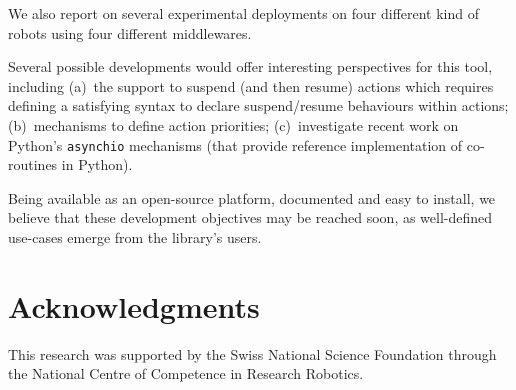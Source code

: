 \documentclass[letterpaper, 10pt, conference]{ieeeconf}      %
\begin{document}
We also report on several experimental deployments on four different
kind of robots using four different middlewares.

Several possible developments would offer interesting perspectives for this
tool, including (a)~the support to suspend (and then resume) actions which
requires defining a satisfying syntax to declare suspend/resume behaviours
within actions; (b)~mechanisms to define action priorities; (c)~investigate
recent work on Python's {\tt asynchio} mechanisms (that provide reference
implementation of co-routines in Python).

Being available as an open-source platform, documented and easy to install, we
believe that these development objectives may be reached soon, as well-defined
use-cases emerge from the library's users.

\section*{Acknowledgments}

This research was supported by the Swiss National Science Foundation through the
National Centre of Competence in Research Robotics.




\end{document}
